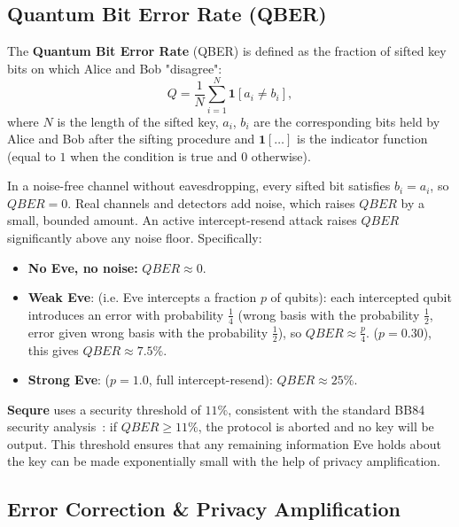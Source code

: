 \documentclass[12pt, a4paper]{article}
\begin{document}
\subsection{Quantum Bit Error Rate (QBER)}
\label{sec:qber}

The \textbf{Quantum Bit Error Rate} (QBER) is defined as the fraction of
sifted key bits on which Alice and Bob "disagree":
\begin{equation*}
  Q = \frac{1}{N} \sum_{i=1}^{N} \mathbf{1}[a_i \neq b_i],
  \label{eq:qber}
\end{equation*}
where $N$ is the length of the sifted key, $a_i$, $b_i$ are the
corresponding bits held by Alice and Bob after the sifting procedure and $\mathbf{1}[\dots]$ is the indicator function (equal to $1$ when the condition is true and $0$ otherwise).

In a noise-free channel without eavesdropping, every sifted bit satisfies  $b_i = a_i$, so $QBER = 0$. Real channels and detectors add noise, which raises $QBER$ by a small, bounded amount. An active intercept-resend attack raises $QBER$ significantly above any
noise floor. Specifically:

\begin{itemize}
  \item \textbf{No Eve, no noise:} $QBER \approx 0$.
  \item \textbf{Weak Eve}: (i.e. Eve intercepts a fraction $p$ of qubits): each intercepted
        qubit introduces an error with probability $\frac{1}{4}$ (wrong basis
        with the probability $\frac{1}{2}$, error given wrong basis with the probability
        $\frac{1}{2}$), so $QBER \approx \frac{p}{4}$. 
        ($p = 0.30$), this gives $QBER \approx 7.5\%$.
  \item \textbf{Strong Eve}: ($p = 1.0$, full intercept-resend): $QBER \approx 25\%$.
\end{itemize}

\textbf{Sequre} uses a security threshold of $11\%$, consistent with
the standard BB84 security analysis~\cite{shorPreskill2000}: if $QBER \geq 11\%$,
the protocol is aborted and no key will be output. This threshold ensures that any
remaining information Eve holds about the key can be made exponentially small
with the help of privacy amplification.

\subsection{Error Correction \& Privacy Amplification}
\label{sec:ec-pa}
\end{document}
